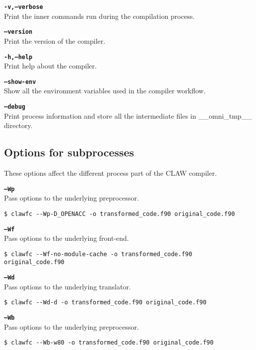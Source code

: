 \documentclass{article}
\begin{document}
\textbf{\texttt{-v,--verbose}}\\
Print the inner commands run during the compilation process. 

\textbf{\texttt{--version}}\\
Print the version of the compiler. 

\textbf{\texttt{-h,--help}}\\
Print help about the compiler. 

\textbf{\texttt{--show-env}}\\
Show all the environment variables used in the compiler workflow. 

\textbf{\texttt{--debug}}\\
Print process information and store all the intermediate files in \_\_omni\_tmp\_\_ directory. 

\subsection{Options for subprocesses}
These options affect the different process part of the CLAW compiler. 

\textbf{\texttt{--Wp}}\\
Pass options to the underlying preprocessor. 
\begin{lstlisting}
$ clawfc --Wp-D_OPENACC -o transformed_code.f90 original_code.f90
\end{lstlisting}

\textbf{\texttt{--Wf}}\\
Pass options to the underlying front-end. 
\begin{lstlisting}
$ clawfc --Wf-no-module-cache -o transformed_code.f90 original_code.f90
\end{lstlisting}

\textbf{\texttt{--Wd}}\\
Pass options to the underlying translator. 
\begin{lstlisting}
$ clawfc --Wd-d -o transformed_code.f90 original_code.f90
\end{lstlisting}

\textbf{\texttt{--Wb}}\\
Pass options to the underlying preprocessor. 
\begin{lstlisting}
$ clawfc --Wb-w80 -o transformed_code.f90 original_code.f90
\end{lstlisting}
\end{document}
